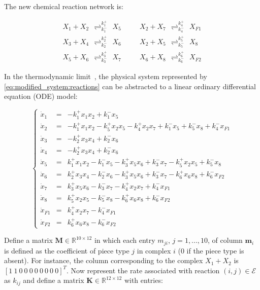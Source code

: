 		The new chemical reaction network is:
		
		\begin{eqnarray}
			X_1 + X_2 ~~{\mathop{\rightleftharpoons}_{k_1^-}^{k_1^+}}~~ X_5 & \quad &  X_2 + X_7 ~~{\mathop{\rightleftharpoons}_{k_4^-}^{k_4^+}}~~ X_{F1} \nonumber \\
			X_3 + X_4 ~~{\mathop{\rightleftharpoons}_{k_2^-}^{k_2^+}}~~ X_6 & & X_2 + X_5 ~~{\mathop{\rightleftharpoons}_{k_5^-}^{k_5^+}}~~ X_8 \nonumber \\
			X_5 + X_6 ~~{\mathop{\rightleftharpoons}_{k_3^-}^{k_3^+}}~~ X_7 & & X_6 + X_8 ~~{\mathop{\rightleftharpoons}_{k_6^-}^{k_6^+}}~~ X_{F2}
			\label{eq:modified_system:reactions}
		\end{eqnarray}

		
		In the thermodynamic limit~\cite{Gillespie:2007p1788}, the physical system represented by \eqref{eq:modified_system:reactions} can be abstracted to a linear ordinary differential equation (ODE) model:
		
		\begin{equation}\label{eq:ODEequations}
			\left\lbrace\begin{array}{lll}
				\dot{x}_1 &=& - k_1^+ x_1 x_2 + k_1^- x_5  \\
				\dot{x}_2 &=& - k_1^+ x_1 x_2 - k_5^+ x_2 x_5 - k_4^+ x_2 x_7 + k_1^- x_5 + k_{5}^- x_8 + k_4^- x_{F1}  \\
				\dot{x}_3 &=& - k_2^+ x_3 x_4 + k_2^- x_6 \\
				\dot{x}_4 &=& - k_2^+ x_3 x_4 + k_2^- x_6  \\
				\dot{x}_5 &=& 	k_1^+ x_1 x_2 - k_1^- x_5 - k_3^+ x_5 x_6 + k_3^- x_7 - k_5^+ x_2 x_5 + k_{5}^- x_8  \\
				\dot{x}_6 &=&   k_2^+ x_3 x_4 - k_2^- x_6 - k_3^+ x_5 x_6 + k_3^- x_7 - k_{6}^+ x_6 x_8 + k_{6}^- x_{F2} \\
				\dot{x}_7 &=& 	k_3^+ x_5 x_6 - k_3^- x_7 - k_4^+ x_2 x_7 + k_4^- x_{F1} \\
				\dot{x}_8 &=& 	k_5^+ x_2 x_5 - k_{5}^- x_8 - k_{6}^+ x_6 x_8 + k_{6}^- x_{F2} \\
				\dot{x}_{F1} &=& k_4^+ x_2 x_7 - k_4^- x_{F1} \\
				\dot{x}_{F2} &=& k_{6}^+ x_6 x_8 - k_{6}^- x_{F2}
			\end{array}
			\right.
		\end{equation}
		
		Define a matrix $\mathbf{M} \in \mathbb{R}^{10 \times 12}$ in which
		each entry $m_{ji}$, $j=1,...,10$, of column $\mathbf{m}_i$ is
		defined as the coefficient of piece type $j$ in complex $i$ ($0$ if
		the piece type is absent). For instance, the column corresponding
		to the complex $X_1 + X_2$ is $[1~1~0~0~0~0~0~0~0~0]^T$.
		Now	represent the rate associated with reaction $(i,j) \in \mathcal{E}$
		as $k_{ij}$ and define a matrix $\mathbf{K} \in \mathbb{R}^{12
		\times 12}$ with entries:

